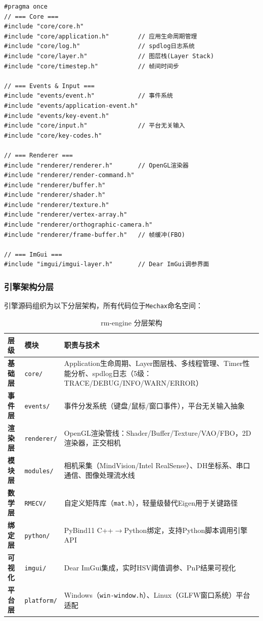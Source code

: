 \documentclass[12pt,a4paper]{ctexart}
\begin{document}
\begin{lstlisting}[style=cppstyle, caption={rm-engine 引擎门面头文件（rmengine.h）}]
#pragma once
// === Core ===
#include "core/core.h"
#include "core/application.h"        // 应用生命周期管理
#include "core/log.h"                // spdlog日志系统
#include "core/layer.h"              // 图层栈(Layer Stack)
#include "core/timestep.h"           // 帧间时间步

// === Events & Input ===
#include "events/event.h"            // 事件系统
#include "events/application-event.h"
#include "events/key-event.h"
#include "core/input.h"              // 平台无关输入
#include "core/key-codes.h"

// === Renderer ===
#include "renderer/renderer.h"       // OpenGL渲染器
#include "renderer/render-command.h"
#include "renderer/buffer.h"
#include "renderer/shader.h"
#include "renderer/texture.h"
#include "renderer/vertex-array.h"
#include "renderer/orthographic-camera.h"
#include "renderer/frame-buffer.h"   // 帧缓冲(FBO)

// === ImGui ===
#include "imgui/imgui-layer.h"       // Dear ImGui调参界面
\end{lstlisting}

\subsubsection{引擎架构分层}

引擎源码组织为以下分层架构，所有代码位于\texttt{Mechax}命名空间：

\begin{table}[H]
\centering
\caption{rm-engine 分层架构}
\begin{tabular}{p{2cm}p{4cm}p{6.5cm}}
\toprule
\textbf{层级} & \textbf{模块} & \textbf{职责与技术} \\
\midrule
\textbf{基础层} & \texttt{core/} & Application生命周期、Layer图层栈、多线程管理、Timer性能分析、spdlog日志（5级：TRACE/DEBUG/INFO/WARN/ERROR） \\
\textbf{事件层} & \texttt{events/} & 事件分发系统（键盘/鼠标/窗口事件），平台无关输入抽象 \\
\textbf{渲染层} & \texttt{renderer/} & OpenGL渲染管线：Shader/Buffer/Texture/VAO/FBO，2D渲染器，正交相机 \\
\textbf{模块层} & \texttt{modules/} & 相机采集（MindVision/Intel RealSense）、DH坐标系、串口通信、图像处理流水线 \\
\textbf{数学层} & \texttt{RMECV/} & 自定义矩阵库（\texttt{mat.h}），轻量级替代Eigen用于关键路径 \\
\textbf{绑定层} & \texttt{python/} & PyBind11 C++$\to$Python绑定，支持Python脚本调用引擎API \\
\textbf{可视化} & \texttt{imgui/} & Dear ImGui集成，实时HSV阈值调参、PnP结果可视化 \\
\textbf{平台层} & \texttt{platform/} & Windows（\texttt{win-window.h}）、Linux（GLFW窗口系统）平台适配 \\
\bottomrule
\end{tabular}
\end{table}
\end{document}
